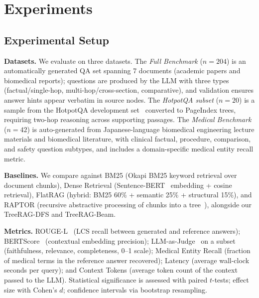 \documentclass[sigconf,review,anonymous]{acmart}
\begin{document}
\section{Experiments}
\label{sec:experiments}

\subsection{Experimental Setup}
\textbf{Datasets.} We evaluate on three datasets. The \emph{Full Benchmark}
($n=204$) is an automatically generated QA set spanning 7 documents (academic
papers and biomedical reports); questions are produced by the LLM with three
types (factual/single-hop, multi-hop/cross-section, comparative), and validation
ensures answer hints appear verbatim in source nodes. The \emph{HotpotQA subset}
($n=20$) is a sample from the HotpotQA development set~\cite{yang2018hotpotqa}
converted to PageIndex trees, requiring two-hop reasoning across supporting
passages. The \emph{Medical Benchmark} ($n=42$) is auto-generated from
Japanese-language biomedical engineering lecture materials and biomedical
literature, with clinical factual, procedure, comparison, and safety question
subtypes, and includes a domain-specific medical entity recall metric.

\textbf{Baselines.} We compare against BM25 (Okapi BM25 keyword retrieval over
document chunks), Dense Retrieval (Sentence-BERT~\cite{reimers2019sbert}
embedding + cosine retrieval), FlatRAG (hybrid: BM25 60\% + semantic 25\% +
structural 15\%), and RAPTOR (recursive abstractive processing of chunks into a
tree~\cite{sarthi2024raptor}), alongside our TreeRAG-DFS and TreeRAG-Beam.

\textbf{Metrics.} ROUGE-L~\cite{lin2004rouge} (LCS recall between generated and
reference answers); BERTScore~\cite{zhang2020bertscore} (contextual embedding
precision); LLM-as-Judge~\cite{zheng2023judging} on a subset (faithfulness,
relevance, completeness, 0--1 scale); Medical Entity Recall (fraction of medical
terms in the reference answer recovered); Latency (average wall-clock seconds per
query); and Context Tokens (average token count of the context passed to the
LLM). Statistical significance is assessed with paired $t$-tests; effect size
with Cohen's $d$; confidence intervals via bootstrap resampling.
\end{document}
